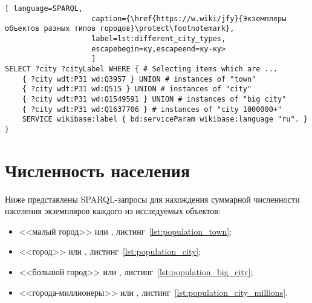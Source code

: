 \begin{lstlisting}[ language=SPARQL, 
                    caption={\href{https://w.wiki/jfy}{Экземпляры объектов разных типов городов}\protect\footnotemark},
                    label=lst:different_city_types, 
                    escapebegin=ку,escapeend=ку-ку>
                    ]
SELECT ?city ?cityLabel WHERE { # Selecting items which are ...
	{ ?city wdt:P31 wd:Q3957 } UNION # instances of "town"
	{ ?city wdt:P31 wd:Q515 } UNION # instances of "city"
	{ ?city wdt:P31 wd:Q1549591 } UNION # instances of "big city"
	{ ?city wdt:P31 wd:Q1637706 } # instances of "city 1000000+"                                
	SERVICE wikibase:label { bd:serviceParam wikibase:language "ru". }
}
\end{lstlisting}


\section{Численность населения}

Ниже представлены SPARQL-запросы для нахождения суммарной численности населения экземпляров каждого из исследуемых объектов: 
\begin{itemize}
	\item <<малый город>> или , листинг~\ref{lst:population_town};
	\item <<город>> или , листинг~\ref{lst:population_city};
	\item <<большой город>> или , листинг~\ref{lst:population_big_city};
	\item <<города-миллионеры>> или , листинг~\ref{lst:population_city_millions}.
\end{itemize}


